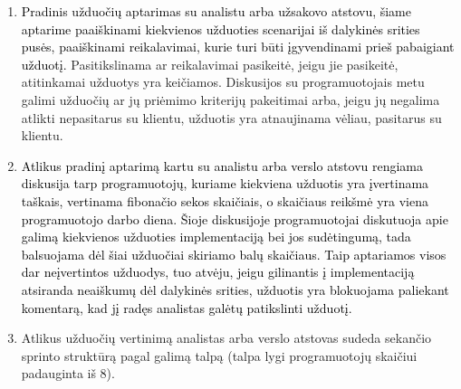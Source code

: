 \documentclass{VUMIFPSkursinis}
\begin{document}
	\begin{enumerate}
		\item{
			\textcolor{black}{Pradinis užduočių aptarimas su analistu arba užsakovo atstovu, šiame aptarime paaiškinami kiekvienos užduoties scenarijai iš dalykinės srities pusės, paaiškinami reikalavimai, kurie turi būti įgyvendinami prieš pabaigiant užduotį.}
			Pasitikslinama ar reikalavimai pasikeitė, jeigu jie pasikeitė, atitinkamai užduotys yra keičiamos.
			Diskusijos su programuotojais metu galimi užduočių ar jų priėmimo kriterijų pakeitimai arba, jeigu jų negalima atlikti nepasitarus su klientu, užduotis yra atnaujinama vėliau, pasitarus su klientu.
		}
		\item{
			\textcolor{black}{Atlikus pradinį aptarimą kartu su analistu arba verslo atstovu rengiama diskusija tarp programuotojų, kuriame kiekviena užduotis yra įvertinama taškais, vertinama fibonačio sekos skaičiais, o skaičiaus reikšmė yra viena programuotojo darbo diena.
			Šioje diskusijoje programuotojai diskutuoja apie galimą kiekvienos užduoties implementaciją bei jos sudėtingumą, tada balsuojama dėl šiai užduočiai skiriamo balų skaičiaus.
			Taip aptariamos visos dar neįvertintos užduodys, tuo atvėju, jeigu gilinantis į implementaciją atsiranda neaiškumų dėl dalykinės srities, užduotis yra blokuojama paliekant komentarą, kad jį radęs analistas galėtų patikslinti užduotį.
		}}
		\item{
			Atlikus užduočių vertinimą analistas arba verslo atstovas sudeda sekančio sprinto struktūrą pagal galimą talpą (talpa lygi programuotojų skaičiui padauginta iš 8).
		}
	\end{enumerate}
\end{document}
